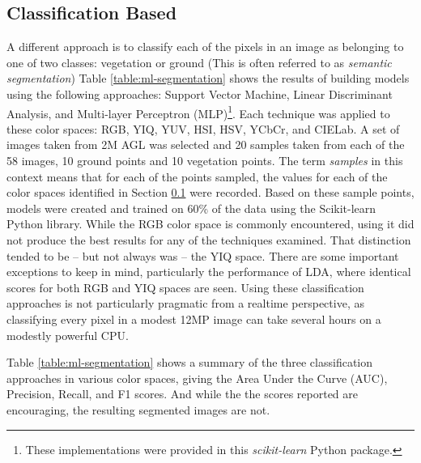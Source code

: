 \documentclass[letterpaper]{article}
\begin{document}
{{\subsection{Classification Based}
\label{section:classification}
A different approach is to classify each of the pixels in an image as belonging to one of two classes: vegetation or ground (This is often referred to as \textit{semantic segmentation}) Table \ref{table:ml-segmentation} shows the results of building models using the following approaches:  Support Vector Machine, Linear Discriminant Analysis, and Multi-layer Perceptron (MLP)\footnote{These implementations were provided in this \textit{scikit-learn} Python package.}. Each technique was applied to these color spaces: RGB, YIQ, YUV, HSI, HSV, YCbCr, and CIELab. A set of images taken from 2M AGL was selected and 20 samples taken from each of the 58 images, 10 ground points and 10 vegetation points. The term \textit{samples} in this context means that for each of the points sampled, the values for each of the color spaces identified in Section \ref{section:classification} were recorded. Based on these sample points, models were created and trained on 60\% of the data using the Scikit-learn Python library. While the RGB color space is commonly encountered, using it did not produce the best results for any of the techniques examined. That distinction tended to be -- but not always was -- the YIQ space. There are some important exceptions to keep in mind, particularly the performance of LDA, where identical scores for both RGB and YIQ spaces are seen. Using these classification approaches is not particularly pragmatic from a realtime perspective, as classifying every pixel in a modest 12MP image can take several hours on a modestly powerful CPU.

%

Table \ref{table:ml-segmentation} shows a summary of the three classification approaches in various color spaces, giving the Area Under the Curve (AUC), Precision, Recall, and F1 scores. And while the the scores reported are encouraging, the resulting segmented images are not.

\renewcommand*{\arraystretch}{1.1}

}}
\end{document}
